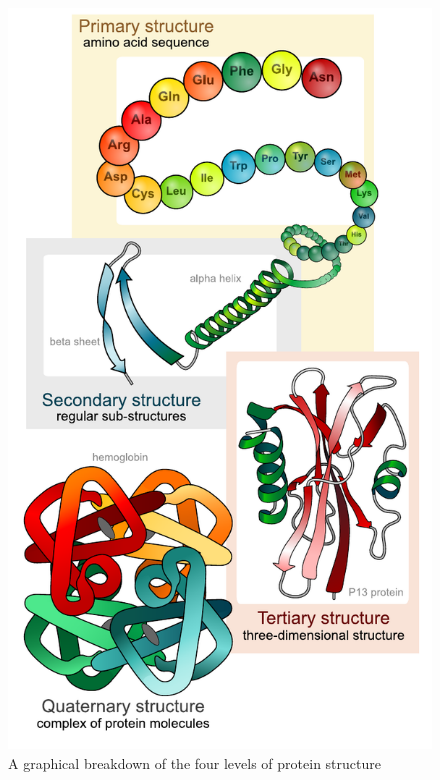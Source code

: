 \documentclass[pageno]{jpaper}
\begin{document}
\begin{figure}[H]
	\centering
	\includegraphics[scale=0.62]{ProteinStructure.pdf}
	\caption{A graphical breakdown of the four levels of protein structure \cite{wiki:2008}}
	\label{fg:protstruc}
\end{figure}
\end{document}

